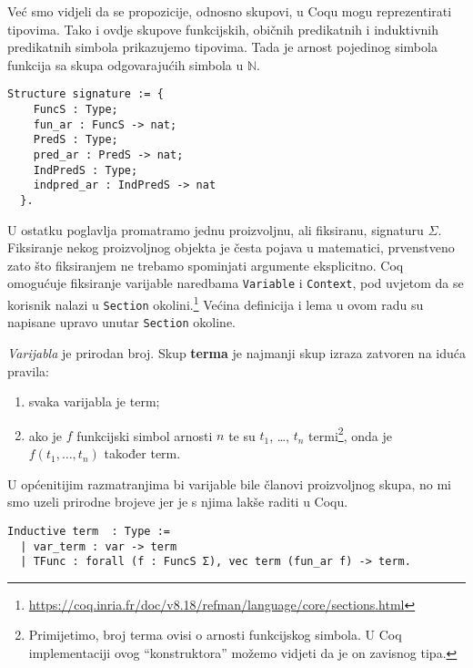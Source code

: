 \noindent Već smo vidjeli da se propozicije, odnosno skupovi, u Coqu mogu reprezentirati tipovima.
Tako i ovdje skupove funkcijskih, običnih predikatnih i induktivnih predikatnih
simbola prikazujemo tipovima.
Tada je arnost pojedinog simbola funkcija sa skupa odgovarajućih simbola u \(\mathbb{N}\).
\begin{verbatim}
Structure signature := {
    FuncS : Type;
    fun_ar : FuncS -> nat;
    PredS : Type;
    pred_ar : PredS -> nat;
    IndPredS : Type;
    indpred_ar : IndPredS -> nat
  }.
\end{verbatim}

\noindent U ostatku poglavlja promatramo jednu proizvoljnu, ali fiksiranu, signaturu \(\Sigma\).
Fiksiranje nekog proizvoljnog objekta je česta pojava u matematici,
prvenstveno zato što fiksiranjem ne trebamo spominjati argumente eksplicitno.
Coq omogućuje fiksiranje varijable naredbama \texttt{Variable} i \texttt{Context},
pod uvjetom da se korisnik nalazi u \texttt{Section} okolini.\footnote{\url{https://coq.inria.fr/doc/v8.18/refman/language/core/sections.html}}
Većina definicija i lema u ovom radu su napisane upravo unutar \texttt{Section} okoline.

\begin{definition}\label{def:term}
  \textit{Varijabla} je prirodan broj. Skup \textbf{terma} je najmanji skup izraza zatvoren na iduća pravila:
  \begin{enumerate}
  \item svaka varijabla je term;
  \item ako je \(f\) funkcijski simbol arnosti \(n\) te su \(t_{1}\), \ldots, \(t_{n}\) termi\footnote{Primijetimo, broj terma ovisi o arnosti funkcijskog simbola. U Coq implementaciji ovog ``konstruktora'' možemo vidjeti da je on zavisnog tipa.},
    onda je \(f(t_{1}, \ldots, t_{n})\) također term.
  \end{enumerate}
\end{definition}
U općenitijim razmatranjima bi varijable bile članovi proizvoljnog skupa,
no mi smo uzeli prirodne brojeve jer je s njima lakše raditi u Coqu.

\begin{verbatim}
Inductive term  : Type :=
  | var_term : var -> term 
  | TFunc : forall (f : FuncS Σ), vec term (fun_ar f) -> term.
\end{verbatim}

